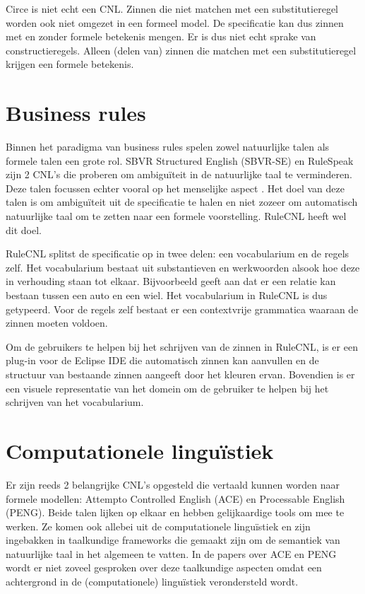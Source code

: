Circe is niet echt een CNL. Zinnen die niet matchen met een substitutieregel worden ook niet omgezet in een formeel model. De specificatie kan dus zinnen met en zonder formele betekenis mengen. Er is dus niet echt sprake van constructieregels. Alleen (delen van) zinnen die matchen met een substitutieregel krijgen een formele betekenis.

\section{Business rules}
Binnen het paradigma van business rules spelen zowel natuurlijke talen als formele talen een grote rol. SBVR Structured English (SBVR-SE) \cite{Levy2013} en RuleSpeak \cite{Ross2009a} zijn 2 CNL's die proberen om ambigu\"iteit in de natuurlijke taal te verminderen. Deze talen focussen echter vooral op het menselijke aspect \cite{Njonko2014}. Het doel van deze talen is om ambigu\"iteit uit de specificatie te halen en niet zozeer om automatisch natuurlijke taal om te zetten naar een formele voorstelling. RuleCNL \cite{Njonko2014} heeft wel dit doel.

RuleCNL splitst de specificatie op in twee delen: een vocabularium en de regels zelf. Het vocabularium bestaat uit substantieven en werkwoorden alsook hoe deze in verhouding staan tot elkaar. Bijvoorbeeld  geeft aan dat er een relatie kan bestaan tussen een auto en een wiel. Het vocabularium in RuleCNL is dus getypeerd. Voor de regels zelf bestaat er een contextvrije grammatica waaraan de zinnen moeten voldoen.

Om de gebruikers te helpen bij het schrijven van de zinnen in RuleCNL, is er een plug-in voor de Eclipse IDE die automatisch zinnen kan aanvullen en de structuur van bestaande zinnen aangeeft door het kleuren ervan. Bovendien is er een visuele representatie van het domein om de gebruiker te helpen bij het schrijven van het vocabularium.

\section{Computationele lingu\"istiek} Er zijn reeds 2 belangrijke CNL's opgesteld die vertaald kunnen worden naar formele modellen: Attempto Controlled English (ACE) en Processable English (PENG). Beide talen lijken op elkaar en hebben gelijkaardige tools om mee te werken. Ze komen ook allebei uit de computationele lingu\"istiek en zijn ingebakken in taalkundige frameworks die gemaakt zijn om de semantiek van natuurlijke taal in het algemeen te vatten. In de papers over ACE en PENG wordt er niet zoveel gesproken over deze taalkundige aspecten omdat een achtergrond in de (computationele) lingu\"istiek verondersteld wordt.

